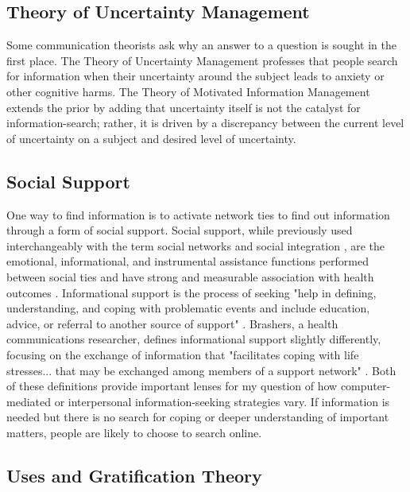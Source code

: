 \subsection{Theory of Uncertainty Management}

Some communication theorists ask why an answer to a question is sought
in the first place. The Theory of Uncertainty Management \citep{brashersCommunicationUncertaintyManagement2001}
professes that people search for information when their uncertainty
around the subject leads to anxiety or other cognitive harms. The Theory
of Motivated Information Management \citep{afifiSeekingInformationSexual2006, afifiTheoryMotivatedInformation2004}
extends the prior by adding that uncertainty itself is not the catalyst
for information-search; rather, it is driven by a discrepancy between
the current level of uncertainty on a subject and desired level of
uncertainty.

\subsection{Social Support}

One way to find information is to activate network ties to find out
information through a form of social support. Social support, while
previously used interchangeably with the term social networks and social
integration \citep{houseStructuresProcessesSocial1988}, are the emotional,
informational, and instrumental assistance functions performed between
social ties and have strong and measurable association with health
outcomes \citep{houseMeasuresConceptsSocial1985, thoitsMechanismsLinkingSocial2011}. Informational support is
the process of seeking "help in defining, understanding, and coping with
problematic events and include education, advice, or referral to another
source of support" \citep[p. 640]{winemiller_etal93}. Brashers, a health
communications researcher, defines informational support slightly
differently, focusing on the exchange of information that "facilitates
coping with life stresses... that may be exchanged among members of a
support network" \citeyearpar[p. 260]{brashersInformationSeekingAvoiding2002}.
Both of these definitions provide important
lenses for my question of how computer-mediated or interpersonal
information-seeking strategies vary. If information is needed but there
is no search for coping or deeper understanding of important matters,
people are likely to choose to search online.

\subsection{Uses and Gratification Theory}

